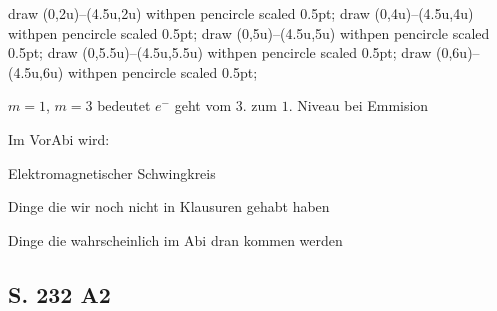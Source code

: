 draw (0,2u)--(4.5u,2u) withpen pencircle scaled 0.5pt;
draw (0,4u)--(4.5u,4u) withpen pencircle scaled 0.5pt;
draw (0,5u)--(4.5u,5u) withpen pencircle scaled 0.5pt;
draw (0,5.5u)--(4.5u,5.5u) withpen pencircle scaled 0.5pt;
draw (0,6u)--(4.5u,6u) withpen pencircle scaled 0.5pt;

\stopMPpage
\stopbuffer


$m=1$, $m=3$ bedeutet $e^-$ geht vom $3.$ zum $1.$ Niveau bei Emmision


\startframedtipp
Im VorAbi wird:

\startitemize[packed]
\item Elektromagnetischer Schwingkreis
\item Dinge die wir noch nicht in Klausuren gehabt haben
\item Dinge die wahrscheinlich im Abi dran kommen werden
\stopitemize
\stopframedtipp

\subsection{S. 232 A2}


